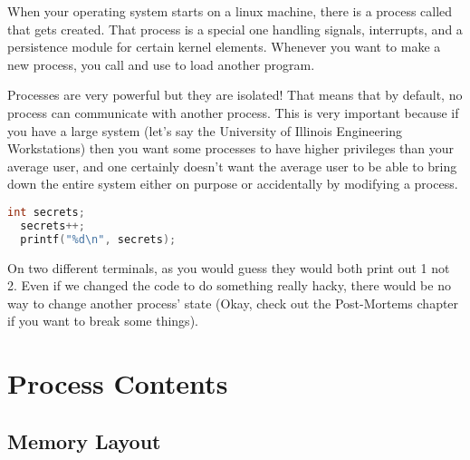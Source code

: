 When your operating system starts on a linux machine, there is a process called  that gets created.
That process is a special one handling signals, interrupts, and a persistence module for certain kernel elements.
Whenever you want to make a new process, you call  and use  to load another program.

Processes are very powerful but they are isolated!
That means that by default, no process can communicate with another process.
This is very important because if you have a large system (let's say the University of Illinois Engineering Workstations) then you want some processes to have higher privileges than your average user, and one certainly doesn't want the average user to be able to bring down the entire system either on purpose or accidentally by modifying a process.

\begin{lstlisting}[language=C]
  int secrets;
  secrets++;
  printf("%d\n", secrets);
\end{lstlisting}

On two different terminals, as you would guess they would both print out 1 not 2.
Even if we changed the code to do something really hacky, there would be no way to change another process' state (Okay, check out the Post-Mortems chapter if you want to break some things).

\section{Process Contents}

\subsection{Memory Layout}

